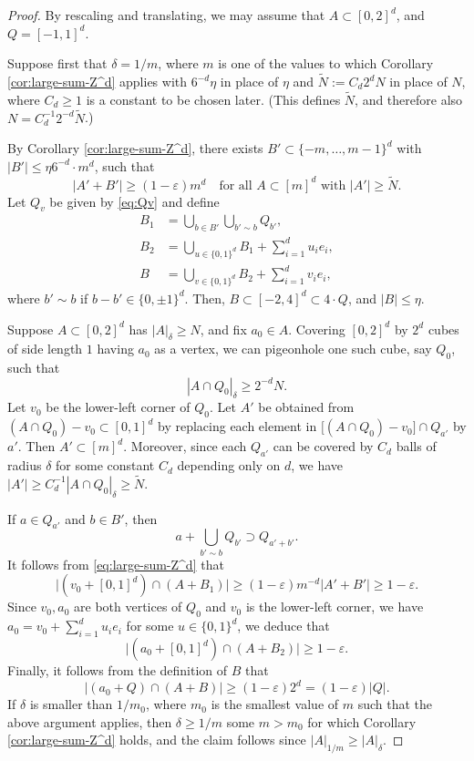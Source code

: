 \documentclass[12pt]{amsart}
\newcommand{\e}{\varepsilon}
\numberwithin{theorem}{section}
\numberwithin{equation}{section}
\begin{document}
\begin{proof}
    By rescaling and translating, we may assume that  $A\subset [0,2]^d$, and $Q=[-1,1]^d$.

    Suppose first that $\delta=1/m$, where $m$ is one of the values to which Corollary \ref{cor:large-sum-Z^d} applies with $6^{-d}\eta$ in place of $\eta$ and $\widetilde{N}:=C_d 2^d N$ in place of $N$, where $C_d \geq 1$ is a constant to be chosen later. (This defines $\widetilde{N}$, and therefore also $N=C_d^{-1} 2^{-d}\widetilde{N}$.)

    By Corollary \ref{cor:large-sum-Z^d}, there exists $B'\subset \{-m,\ldots, m-1\}^d$ with $|B'|\le \eta 6^{-d}\cdot m^d$, such that
    \begin{equation} \label{eq:large-sum-Z^d}
        |A'+B'| \ge (1-\e) m^d \quad\text{for all } A\subset [m]^d \text{ with } |A'|\ge \widetilde{N}.
    \end{equation}
    Let $Q_v$ be given by \eqref{eq:Qv} and define
    \begin{align*}
        B_1 &= \bigcup_{b\in B'} \bigcup_{b'\sim b} Q_{b'},\\
        B_2 &= \bigcup_{u\in\{0,1\}^d} B_1+\sum_{i=1}^d u_i e_i,\\
        B &= \bigcup_{v\in\{0,1\}^d} B_2 +\sum_{i=1}^d v_i e_i,
    \end{align*}
    where $b'\sim b$ if $b-b'\in \{0,\pm 1\}^d$. Then, $B\subset [-2,4]^d\subset 4\cdot Q$, and $|B|\le \eta$.

    Suppose $A\subset [0,2]^d$ has $|A|_{\delta}\ge N$, and fix $a_0\in A$. Covering $[0,2]^d$ by $2^d$ cubes of side length $1$ having $a_0$ as a vertex, we can pigeonhole one such cube, say $Q_0$, such that
    \[
        |A\cap Q_0|_{\delta} \ge 2^{-d} N .
    \]
    Let $v_0$ be the lower-left corner of $Q_0$.
    Let $A'$ be obtained from $(A\cap Q_0)-v_0\subset [0,1]^d$ by replacing each element in $\bigl[(A\cap Q_0)-v_0\bigr]\cap Q_{a'}$ by $a'$. Then $A'\subset [m]^d$. Moreover, since each $Q_{a'}$ can be covered by $C_d$ balls of radius $\delta$ for some constant $C_d$ depending only on $d$, we have $|A'| \ge C_d^{-1} |A\cap Q_0|_{\delta} \ge \widetilde{N}$.


    If $a\in Q_{a'}$ and $b\in B'$, then
    \[
        a+\bigcup_{b'\sim b} Q_{b'} \supset Q_{a'+b'}.
    \]
    It follows from \eqref{eq:large-sum-Z^d} that
    \[
        \bigl|(v_0+[0,1]^d)\cap (A+B_1)\bigr| \ge (1-\e) m^{-d}|A'+B'|\ge 1-\e.
    \]
    Since $v_0, a_0$ are both vertices of $Q_0$ and $v_0$ is the lower-left corner, we have $a_0=v_0+\sum_{i=1}^d u_i e_i$ for some $u\in\{0,1\}^d$, we deduce that
    \[
        \bigl|(a_0+[0,1]^d)\cap (A+B_2) \bigr| \ge 1-\e.
    \]
    Finally, it follows from the definition of $B$ that
    \[
        \bigl|(a_0+Q)\cap (A+B)\bigr| \ge (1-\e)2^d = (1-\e)|Q|.
    \]
    If $\delta$ is smaller than $1/m_0$, where $m_0$ is the smallest value of $m$ such that the above argument applies, then $\delta
    \ge 1/m$ some $m>m_0$ for which Corollary \ref{cor:large-sum-Z^d} holds, and the claim follows since $|A|_{1/m}\ge |A|_{\delta}$.
\end{proof}
\end{document}
